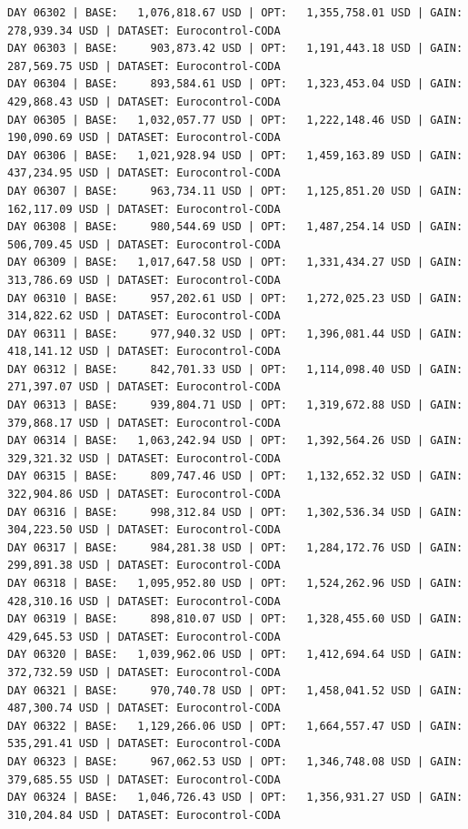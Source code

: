 \documentclass[11pt,a4paper]{article}
\begin{document}
\begin{verbatim}
DAY 06302 | BASE:   1,076,818.67 USD | OPT:   1,355,758.01 USD | GAIN: 278,939.34 USD | DATASET: Eurocontrol-CODA
DAY 06303 | BASE:     903,873.42 USD | OPT:   1,191,443.18 USD | GAIN: 287,569.75 USD | DATASET: Eurocontrol-CODA
DAY 06304 | BASE:     893,584.61 USD | OPT:   1,323,453.04 USD | GAIN: 429,868.43 USD | DATASET: Eurocontrol-CODA
DAY 06305 | BASE:   1,032,057.77 USD | OPT:   1,222,148.46 USD | GAIN: 190,090.69 USD | DATASET: Eurocontrol-CODA
DAY 06306 | BASE:   1,021,928.94 USD | OPT:   1,459,163.89 USD | GAIN: 437,234.95 USD | DATASET: Eurocontrol-CODA
DAY 06307 | BASE:     963,734.11 USD | OPT:   1,125,851.20 USD | GAIN: 162,117.09 USD | DATASET: Eurocontrol-CODA
DAY 06308 | BASE:     980,544.69 USD | OPT:   1,487,254.14 USD | GAIN: 506,709.45 USD | DATASET: Eurocontrol-CODA
DAY 06309 | BASE:   1,017,647.58 USD | OPT:   1,331,434.27 USD | GAIN: 313,786.69 USD | DATASET: Eurocontrol-CODA
DAY 06310 | BASE:     957,202.61 USD | OPT:   1,272,025.23 USD | GAIN: 314,822.62 USD | DATASET: Eurocontrol-CODA
DAY 06311 | BASE:     977,940.32 USD | OPT:   1,396,081.44 USD | GAIN: 418,141.12 USD | DATASET: Eurocontrol-CODA
DAY 06312 | BASE:     842,701.33 USD | OPT:   1,114,098.40 USD | GAIN: 271,397.07 USD | DATASET: Eurocontrol-CODA
DAY 06313 | BASE:     939,804.71 USD | OPT:   1,319,672.88 USD | GAIN: 379,868.17 USD | DATASET: Eurocontrol-CODA
DAY 06314 | BASE:   1,063,242.94 USD | OPT:   1,392,564.26 USD | GAIN: 329,321.32 USD | DATASET: Eurocontrol-CODA
DAY 06315 | BASE:     809,747.46 USD | OPT:   1,132,652.32 USD | GAIN: 322,904.86 USD | DATASET: Eurocontrol-CODA
DAY 06316 | BASE:     998,312.84 USD | OPT:   1,302,536.34 USD | GAIN: 304,223.50 USD | DATASET: Eurocontrol-CODA
DAY 06317 | BASE:     984,281.38 USD | OPT:   1,284,172.76 USD | GAIN: 299,891.38 USD | DATASET: Eurocontrol-CODA
DAY 06318 | BASE:   1,095,952.80 USD | OPT:   1,524,262.96 USD | GAIN: 428,310.16 USD | DATASET: Eurocontrol-CODA
DAY 06319 | BASE:     898,810.07 USD | OPT:   1,328,455.60 USD | GAIN: 429,645.53 USD | DATASET: Eurocontrol-CODA
DAY 06320 | BASE:   1,039,962.06 USD | OPT:   1,412,694.64 USD | GAIN: 372,732.59 USD | DATASET: Eurocontrol-CODA
DAY 06321 | BASE:     970,740.78 USD | OPT:   1,458,041.52 USD | GAIN: 487,300.74 USD | DATASET: Eurocontrol-CODA
DAY 06322 | BASE:   1,129,266.06 USD | OPT:   1,664,557.47 USD | GAIN: 535,291.41 USD | DATASET: Eurocontrol-CODA
DAY 06323 | BASE:     967,062.53 USD | OPT:   1,346,748.08 USD | GAIN: 379,685.55 USD | DATASET: Eurocontrol-CODA
DAY 06324 | BASE:   1,046,726.43 USD | OPT:   1,356,931.27 USD | GAIN: 310,204.84 USD | DATASET: Eurocontrol-CODA

\end{verbatim}
\end{document}
